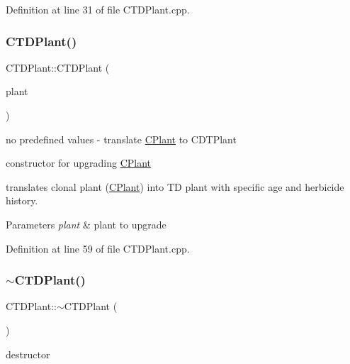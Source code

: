 Definition at line 31 of file C\+T\+D\+Plant.\+cpp.

\mbox{\label{class_c_t_d_plant_a40351d1506a0032e241dbf8dfedef569}} 
\subsubsection{\texorpdfstring{CTDPlant()}{CTDPlant()}\hspace{0.1cm}{\footnotesize\ttfamily [3/3]}}
{\footnotesize\ttfamily C\+T\+D\+Plant\+::\+C\+T\+D\+Plant (\begin{DoxyParamCaption}\item[{\mbox{\hyperlink{class_c_plant}{C\+Plant}} $\ast$}]{plant }\end{DoxyParamCaption})}



no predefined values -\/ translate \mbox{\hyperlink{class_c_plant}{C\+Plant}} to C\+D\+T\+Plant 

constructor for upgrading \mbox{\hyperlink{class_c_plant}{C\+Plant}}

translates clonal plant (\mbox{\hyperlink{class_c_plant}{C\+Plant}}) into TD plant with specific age and herbicide history. 
\begin{DoxyParams}{Parameters}
{\em plant} & plant to upgrade \\
\hline
\end{DoxyParams}


Definition at line 59 of file C\+T\+D\+Plant.\+cpp.

\mbox{\label{class_c_t_d_plant_a47b82e5be7be1ff3e8670229a68d053d}} 
\subsubsection{\texorpdfstring{$\sim$CTDPlant()}{~CTDPlant()}}
{\footnotesize\ttfamily C\+T\+D\+Plant\+::$\sim$\+C\+T\+D\+Plant (\begin{DoxyParamCaption}{ }\end{DoxyParamCaption})\hspace{0.3cm}{\ttfamily [virtual]}}



destructor 

